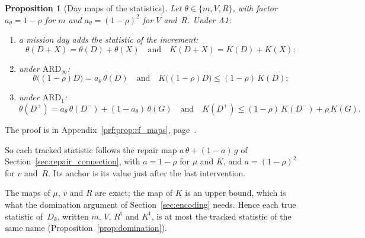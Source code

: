 \documentclass[11pt,a4paper]{article}
\theoremstyle{plain}
\newtheorem{proposition}[theorem]{Proposition}
\theoremstyle{definition}
\theoremstyle{remark}
\begin{document}
\begin{proposition}[Day maps of the statistics]\label{prop:rf_maps}
Let $\theta \in \{m, V, R\}$, with factor $a_\theta = 1-\rho$ for $m$ and $a_\theta = (1-\rho)^2$ for $V$ and~$R$.
Under A1:
\begin{enumerate}
  \item a mission day adds the statistic of the increment:
    \begin{equation}
      \theta(D + X) = \theta(D) + \theta(X)
      \quad\text{and}\quad
      K(D + X) = K(D) + K(X);
    \end{equation}
  \item under $\text{ARD}_\infty$:
    \begin{equation}
      \theta\bigl((1-\rho)D\bigr) = a_\theta\,\theta(D)
      \quad\text{and}\quad
      K\bigl((1-\rho)D\bigr) \le (1-\rho)\,K(D);
    \end{equation}
  \item under $\text{ARD}_1$:
    \begin{equation}
      \theta(D^+) = a_\theta\,\theta(D^-) + (1 - a_\theta)\,\theta(G)
      \quad\text{and}\quad
      K(D^+) \le (1-\rho)\,K(D^-) + \rho\,K(G).
    \end{equation}
\end{enumerate}
\end{proposition}
The proof is in Appendix~\ref{prf:prop:rf_maps}, page~\pageref{prf:prop:rf_maps}.

So each tracked statistic follows the repair map $a\,\theta + (1-a)\,g$ of Section~\ref{sec:repair_connection}, with $a = 1-\rho$ for $\mu$ and $K$, and $a = (1-\rho)^2$ for $v$ and~$R$.
Its anchor is its value just after the last intervention.

The maps of $\mu$, $v$ and $R$ are exact; the map of $K$ is an upper bound, which is what the domination argument of Section~\ref{sec:encoding} needs.
Hence each true statistic of~$D_k$, written $m$, $V$, $R^{\mathrm{t}}$ and $K^{\mathrm{t}}$, is at most the tracked statistic of the same name (Proposition~\ref{prop:domination}).
\end{document}
